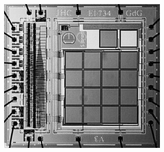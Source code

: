 \begin{frame}[c]
\begin{columns}
\begin{column}{.3\textwidth}
\begin{figure}[H]
            \end{figure}
            \begin{figure}[H] %
                \centering %
                \includegraphics[width=1.\textwidth]{figures/Single-chip CMOS optical microspectrometer_2.jpg} %
            \end{figure}
        \end{column}
    \end{columns}
\end{frame}

